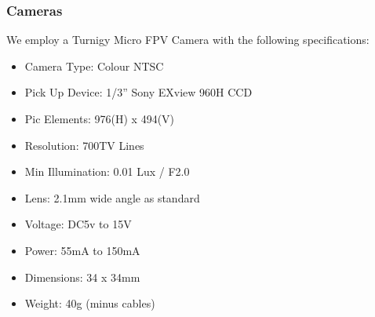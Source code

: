 \documentclass[a4paper, 10pt, twocolumn, titlepage]{article}
\begin{document}
\subsubsection{Cameras}
We employ a Turnigy Micro FPV Camera with the following specifications:
\begin{itemize}
\itemsep-1mm
  \item Camera Type: Colour NTSC
  \item Pick Up Device: 1/3'' Sony EXview 960H CCD
  \item Pic Elements: 976(H) x 494(V)
  \item Resolution: 700TV Lines
  \item Min Illumination: 0.01 Lux / F2.0
  \item Lens: 2.1mm wide angle as standard
  \item Voltage: DC5v to 15V
  \item Power: 55mA to 150mA
  \item Dimensions: 34 x 34mm
  \item Weight: 40g (minus cables)
\end{itemize}
\end{document}
